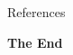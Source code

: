 \documentclass[aspectratio=169,xcolor=dvipsnames]{beamer}
\begin{document}

\begin{frame}{References}
    \footnotesize
    
    
\end{frame}


\begin{frame}
    \Huge{\centerline{\textbf{The End}}}
\end{frame}

\end{document}
